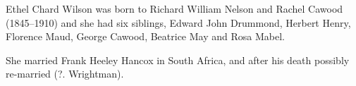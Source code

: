 Ethel Chard Wilson was born to  Richard William Nelson and Rachel Cawood (1845--1910) and she had six siblings,  Edward John Drummond, Herbert Henry, Florence Maud, George Cawood, Beatrice May and Rosa Mabel.

She married Frank Heeley Hancox in South Africa, and after his death possibly re-married (?. Wrightman).
